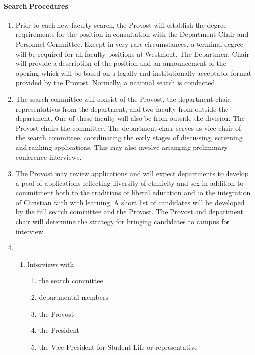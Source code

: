 			\paragraph{Search Procedures}
				\begin{enumerate}[label=\alph*)]
					\item{ Prior to each new faculty search, the Provost will establish the degree requirements for the position in consultation with the Department Chair and Personnel Committee. Except in very rare circumstances, a terminal degree will be required for all faculty positions at Westmont.  The Department Chair will provide a description of the position and an announcement of the opening which will be based on a legally and institutionally acceptable format provided by the Provost.  Normally, a national search is conducted.}
					\item{The search committee will consist of the Provost, the department chair, representatives from the department, and two faculty from outside the department. One of those faculty will also be from outside the division. The Provost chairs the committee. The department chair serves as vice-chair of the search committee, coordinating the early stages of discussing, screening and ranking applications. This may also involve arranging preliminary conference interviews.}
					\item{The Provost may review applications and will expect departments to develop a pool of applications reflecting diversity of ethnicity and sex in addition to commitment both to the traditions of liberal education and to the integration of Christian faith with learning.  A short list of candidates will be developed by the full search committee and the Provost.  The Provost and department chair will determine the strategy for bringing candidates to campus for interview.}
					\item{ 
						\begin{enumerate}[label=(\arabic*)]
							\item{Interviews with
								\begin{enumerate}[label=$\bullet$]
									\item{the search committee}
									\item{departmental members}
									\item{the Provost}
									\item{the President}
									\item{the Vice President for Student Life or representative}

\end{enumerate}}
\end{enumerate}}
\end{enumerate}
